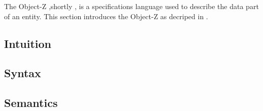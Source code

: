 The Object-Z ,shortly \oz{}, is a specifications language used to describe the data part of an entity. This section introduces the Object-Z as decriped in \cite{olderog}.
\subsection{Intuition}
\label{sec_oz_intuition}


\subsection{Syntax}
\label{sec_oz_syntax}


\subsection{Semantics}
\label{sec_oz_sem}


